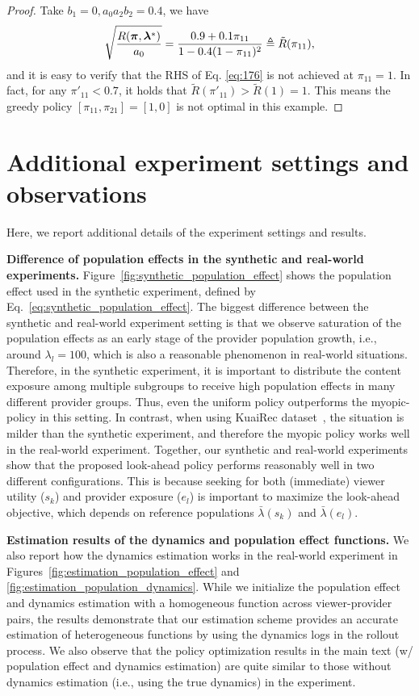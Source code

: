 \begin{proof}
Take $b_1=0, a_0a_2b_2=0.4$, we have 
\begin{equation}\label{eq:176}
    \sqrt{\frac{R(\bm{\pi},\bm{\lambda}^*)}{a_0}}=\frac{0.9+0.1\pi_{11}}{1-0.4(1-\pi_{11})^2}\triangleq\tilde{R}(\pi_{11}),
\end{equation}
and it is easy to verify that the RHS of Eq. \eqref{eq:176} is not achieved at $\pi_{11}=1$. In fact, for any $\pi'_{11}<0.7$, it holds that $\tilde{R}(\pi'_{11})>\tilde{R}(1)=1$. This means the greedy policy $[\pi_{11}, \pi_{21}]=[1, 0]$ is not optimal in this example.

\end{proof}

\section{Additional experiment settings and observations} \label{app:experiment_details}

Here, we report additional details of the experiment settings and results.

\textbf{Difference of population effects in the synthetic and real-world experiments.} \; Figure~\ref{fig:synthetic_population_effect} shows the population effect used in the synthetic experiment, defined by Eq.~\eqref{eq:synthetic_population_effect}. The biggest difference between the synthetic and real-world experiment setting is that we observe saturation of the population effects as an early stage of the provider population growth, i.e., around $\lambda_l = 100$, which is also a reasonable phenomenon in real-world situations. Therefore, in the synthetic experiment, it is important to distribute the content exposure among multiple subgroups to receive high population effects in many different provider groups. Thus, even the uniform policy outperforms the myopic-policy in this setting. In contrast, when using KuaiRec dataset~\citep{gao2022kuairec}, the situation is milder than the synthetic experiment, and therefore the myopic policy works well in the real-world experiment. Together, our synthetic and real-world experiments show that the proposed look-ahead policy performs reasonably well in two different configurations. This is because seeking for both (immediate) viewer utility ($s_k$) and provider exposure ($e_l$) is important to maximize the look-ahead objective, which depends on reference populations $\bar{\lambda}(s_k)$ and $\bar{\lambda}(e_l)$.

\textbf{Estimation results of the dynamics and population effect functions.} \;
We also report how the dynamics estimation works in the real-world experiment in Figures~\ref{fig:estimation_population_effect} and \ref{fig:estimation_population_dynamics}. While we initialize the population effect and dynamics estimation with a homogeneous function across viewer-provider pairs, the results demonstrate that our estimation scheme provides an accurate estimation of heterogeneous functions by using the dynamics logs in the rollout process. We also observe that the policy optimization results in the main text (w/ population effect and dynamics estimation) are quite similar to those without dynamics estimation (i.e., using the true dynamics) in the experiment.

